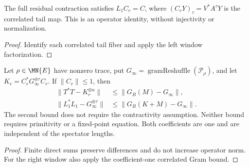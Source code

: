 \begin{lemma}
    \label{thm:residual_window_correlated_factorization}
    \leanok
    The full residual contraction satisfies $L_1C_r=C$, where
    $(C_rY)_\tau=V^*A^\tau Y$ is the correlated tail map.
    This is an operator identity, without injectivity or normalization.
\end{lemma}
\begin{proof}\leanok
    Identify each correlated tail fiber and apply the left window factorization.
\end{proof}

\begin{lemma}
    \label{thm:residual_window_gram_errors}
    \leanok
    Let $\rho\in\MN{E}$ have nonzero trace, put
    $G_\infty=\operatorname{gramReshuffle}(\mathcal P_\rho)$, and let
    $K_r=C_r^*G_\infty^{\oplus\tau}C_r$.
    If $\lVert C_r\rVert\leq1$, then
    \begin{align}
        \lVert T^*T-K_r^{\oplus u}\rVert
         & \leq\lVert G_B(M)-G_\infty\rVert,\nonumber \\
        \lVert L_1^*L_1-G_\infty^{\oplus\tau}\rVert
         & \leq\lVert G_B(K+M)-G_\infty\rVert.
        \label{eq:ph_residual_window_errors}
    \end{align}
    The second bound does not require the contractivity assumption. Neither
    bound requires primitivity or a fixed-point equation. Both coefficients
    are one and are independent of the spectator lengths.
\end{lemma}
\begin{proof}\leanok
    Finite direct sums preserve differences and do not increase operator norm.
    For the right window also apply the coefficient-one correlated Gram bound.
\end{proof}

